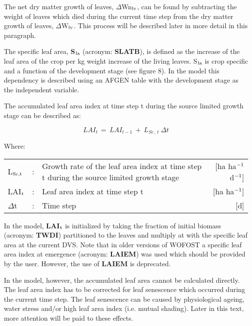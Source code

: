 The net dry matter growth of leaves, $\Delta$Wn$_{{\rm lv}}$, can be found by subtracting the weight of
leaves which died during the current time step from the dry matter growth of leaves,
$\Delta$W$_{{\rm lv}}$. This process will be described later in more detail in this paragraph.

The specific leaf area, {\bf S$_{{\rm la}}$} (acronym: {\bf SLATB}), is defined as the increase of the leaf area
of the crop per kg weight increase of the living leaves. S$_{{\rm la}}$ is crop specific and a function
of the development stage (see figure 8). In the model this dependency is described using
an AFGEN table with the development stage as the independent variable.

The accumulated leaf area index at time step t during the source limited growth stage can
be described as:

\begin{equation}
\label{eq:5.53}
LAI _{t~} =~LAI _{t-1} ~+~L _{Sc\, ,\, t} ~\Delta t
\end{equation}

Where:\\[5pt]
\begin{tabularx}{\textwidth}{llXr}
	L$_{{\rm Sc,t}}$ &:& Growth rate of the leaf area index at time step t
	during the source limited growth stage     &   [ha ha$^{{\rm -1}}$ d$^{{\rm -1}}$]\\
	LAI$_{{\rm t}}$ &:& Leaf area index at time step t     &
	[ha ha$^{{\rm -1}}$]\\
	$\Delta$t &:& Time step    &    [d]\\
\end{tabularx}

In the model, {\bf LAI$_{{\rm t}}$} is initialized by 
taking the fraction of initial biomass (acronym: {\bf TWDI}) partitioned to the leaves and 
multiply at with the specific leaf area at the current DVS. Note that in older versions of
WOFOST a specific leaf area index at emergence (acronym: {\bf LAIEM}) was used which should 
be provided by the user. However, the use of {\bf LAIEM} is deprecated.

In the model, however, the accumulated leaf area cannot be calculated directly. The leaf
area index has to be corrected for leaf senescence which occurred during the current time
step. The leaf senescence can be caused by physiological ageing, water stress and/or high
leaf area index (i.e. mutual shading). Later in this text, more attention will be paid to
these effects.

